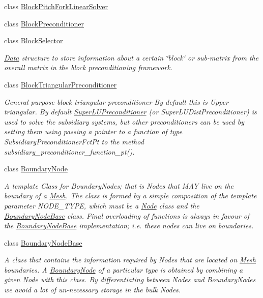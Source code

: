\begin{DoxyCompactItemize}
\item 
class \hyperlink{classoomph_1_1BlockPitchForkLinearSolver}{Block\+Pitch\+Fork\+Linear\+Solver}
\item 
class \hyperlink{classoomph_1_1BlockPreconditioner}{Block\+Preconditioner}
\item 
class \hyperlink{classoomph_1_1BlockSelector}{Block\+Selector}
\begin{DoxyCompactList}\small\item\em \hyperlink{classoomph_1_1Data}{Data} structure to store information about a certain \char`\"{}block\char`\"{} or sub-\/matrix from the overall matrix in the block preconditioning framework. \end{DoxyCompactList}\item 
class \hyperlink{classoomph_1_1BlockTriangularPreconditioner}{Block\+Triangular\+Preconditioner}
\begin{DoxyCompactList}\small\item\em General purpose block triangular preconditioner By default this is Upper triangular. By default \hyperlink{classoomph_1_1SuperLUPreconditioner}{Super\+L\+U\+Preconditioner} (or Super\+L\+U\+Dist\+Preconditioner) is used to solve the subsidiary systems, but other preconditioners can be used by setting them using passing a pointer to a function of type Subsidiary\+Preconditioner\+Fct\+Pt to the method subsidiary\+\_\+preconditioner\+\_\+function\+\_\+pt(). \end{DoxyCompactList}\item 
class \hyperlink{classoomph_1_1BoundaryNode}{Boundary\+Node}
\begin{DoxyCompactList}\small\item\em A template Class for Boundary\+Nodes; that is Nodes that M\+AY live on the boundary of a \hyperlink{classoomph_1_1Mesh}{Mesh}. The class is formed by a simple composition of the template parameter N\+O\+D\+E\+\_\+\+T\+Y\+PE, which must be a \hyperlink{classoomph_1_1Node}{Node} class and the \hyperlink{classoomph_1_1BoundaryNodeBase}{Boundary\+Node\+Base} class. Final overloading of functions is always in favour of the \hyperlink{classoomph_1_1BoundaryNodeBase}{Boundary\+Node\+Base} implementation; i.\+e. these nodes can live on boundaries. \end{DoxyCompactList}\item 
class \hyperlink{classoomph_1_1BoundaryNodeBase}{Boundary\+Node\+Base}
\begin{DoxyCompactList}\small\item\em A class that contains the information required by Nodes that are located on \hyperlink{classoomph_1_1Mesh}{Mesh} boundaries. A \hyperlink{classoomph_1_1BoundaryNode}{Boundary\+Node} of a particular type is obtained by combining a given \hyperlink{classoomph_1_1Node}{Node} with this class. By differentiating between Nodes and Boundary\+Nodes we avoid a lot of un-\/necessary storage in the bulk Nodes. \end{DoxyCompactList}\item 

\end{DoxyCompactItemize}
